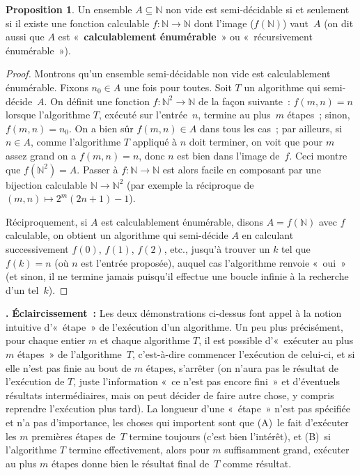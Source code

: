 \documentclass[12pt,a4paper]{article}
\theoremstyle{definition}
\newcommand\thingy{%
\refstepcounter{comcnt}\medskip\noindent\textbf{\thecomcnt.} }
\newtheorem{prop}[comcnt]{Proposition}
\newcommand{\defin}[2][]{\def\latexsucks{#1}\ifx\latexsucks\empty\index{#2}\else\index{\latexsucks}\fi\textbf{#2}}
\begin{document}
\begin{prop}
Un ensemble $A \subseteq \mathbb{N}$ non vide est semi-décidable si et
seulement si il existe une fonction calculable $f \colon \mathbb{N}
\to \mathbb{N}$ dont l'image ($f(\mathbb{N})$) vaut $A$ (on dit aussi
que $A$ est « \defin{calculablement énumérable} » ou
« récursivement énumérable »).
\end{prop}
\begin{proof}
Montrons qu'un ensemble semi-décidable non vide est calculablement
énumérable.  Fixons $n_0 \in A$ une fois pour toutes.  Soit $T$ un
algorithme qui semi-décide $A$.  On définit une fonction $f \colon
\mathbb{N}^2 \to \mathbb{N}$ de la façon suivante : $f(m,n) = n$
lorsque l'algorithme $T$, exécuté sur l'entrée $n$, termine au
plus $m$ étapes ; sinon, $f(m,n) = n_0$.  On a bien sûr $f(m,n) \in A$
dans tous les cas ; par ailleurs, si $n \in A$, comme l'algorithme $T$
appliqué à $n$ doit terminer, on voit que pour $m$ assez grand on a
$f(m,n) = n$, donc $n$ est bien dans l'image de $f$.  Ceci montre que
$f(\mathbb{N}^2) = A$.  Passer à $f\colon \mathbb{N} \to\mathbb{N}$
est alors facile en composant par une bijection calculable $\mathbb{N}
\to \mathbb{N}^2$ (par exemple la réciproque de $(m,n) \mapsto
2^m(2n+1)-1$).

Réciproquement, si $A$ est calculablement énumérable, disons $A =
f(\mathbb{N})$ avec $f$ calculable, on obtient un algorithme qui
semi-décide $A$ en calculant successivement $f(0)$, $f(1)$, $f(2)$,
etc., jusqu'à trouver un $k$ tel que $f(k)=n$ (où $n$ est l'entrée
proposée), auquel cas l'algorithme renvoie « oui » (et sinon, il ne
termine jamais puisqu'il effectue une boucle infinie à la recherche
d'un tel $k$).
\end{proof}

{\footnotesize\thingy\textbf{Éclaircissement :} Les deux démonstrations
  ci-dessus font appel à la notion intuitive d'« étape » de
  l'exécution d'un algorithme.  Un peu plus précisément, pour chaque
  entier $m$ et chaque algorithme $T$, il est possible d'« exécuter au
  plus $m$ étapes » de l'algorithme $T$, c'est-à-dire commencer
  l'exécution de celui-ci, et si elle n'est pas finie au bout de $m$
  étapes, s'arrêter (on n'aura pas le résultat de l'exécution de $T$,
  juste l'information « ce n'est pas encore fini » et d'éventuels
  résultats intermédiaires, mais on peut décider de faire autre chose,
  y compris reprendre l'exécution plus tard).  La longueur d'une
  « étape » n'est pas spécifiée et n'a pas d'importance, les choses
  qui importent sont que (A) le fait d'exécuter les $m$ premières
  étapes de $T$ termine toujours (c'est bien l'intérêt), et (B) si
  l'algorithme $T$ termine effectivement, alors pour $m$ suffisamment
  grand, exécuter au plus $m$ étapes donne bien le résultat final
  de $T$ comme résultat.\par}
\end{document}
